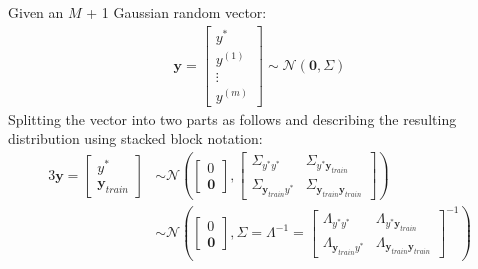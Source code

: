 \documentclass[a4paper,12pt]{article}
\begin{document}
\newcommand{\yTrain}{\bm{y}_{train}}
	\newcommand{\oneOne}{y^* y^*}
	\newcommand{\oneTwo}{y^* \yTrain}
	\newcommand{\twoOne}{\yTrain y^*}
	\newcommand{\twoTwo}{\yTrain \yTrain}
\newcommand{\sigmaMat}{\begin{bmatrix}
		\Sigma_{y^* y^*} & \Sigma_{y^* \yTrain} \\
    	\Sigma_{\yTrain y^*} & \Sigma_{\yTrain \yTrain}
	\end{bmatrix}
}
\newcommand{\lambdaMat}{\begin{bmatrix}
		\Lambda_{y^* y^*} & \Lambda_{y^* \yTrain} \\
    	\Lambda_{\yTrain y^*} & \Lambda_{\yTrain \yTrain}
	\end{bmatrix}
}
\newcommand{\Amat}{\Sigma_{\oneOne}}
\newcommand{\Bmat}{\Sigma_{\oneTwo}}
\newcommand{\Cmat}{\Sigma_{\twoOne}}
\newcommand{\Dmat}{\Sigma_{\twoTwo}}

Given an $M$ + 1 Gaussian random vector:
\begin{align}
	\bm{y} = \begin{bmatrix} 
    		y^* \\ y^{(1)} \\ \vdots \\ y^{(m)}
        \end{bmatrix}
        \sim \mathcal{N} \left( \bm{0}, \Sigma \right) 
\end{align}
Splitting the vector into two parts as follows and describing the resulting distribution 
using stacked block notation:
\begin{alignat}{3}
 	\bm{y} = \begin{bmatrix}
        	y^* \\ \yTrain
        \end{bmatrix}
        & \sim \mathcal{N} \left( \begin{bmatrix}
        		0 \\ \bm{0}
             \end{bmatrix}, \sigmaMat \right) \\
        & \sim \mathcal{N} \left( \begin{bmatrix}
        		0 \\ \bm{0}
             \end{bmatrix}, \Sigma = \Lambda^{-1} = \lambdaMat^{-1} \right)
\end{alignat}
\end{document}
